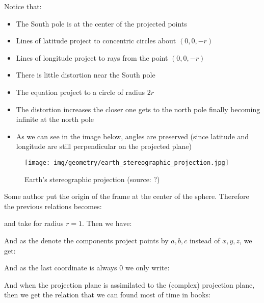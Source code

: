 	Notice that:
	\begin{itemize}
		\item The South pole is at the center of the projected points

		\item Lines of latitude project to concentric circles about $(0,0,-r)$

		\item Lines of longitude project to rays from the point $(0,0,-r)$

		\item There is little distortion near the South pole

		\item The equation project to a circle of radius $2r$

		\item The distortion increases the closer one gets to the north pole finally becoming infinite at the north pole
		
		\item As we can see in the image below, angles are preserved (since latitude and longitude are still perpendicular on the projected plane)
	\end{itemize}
	\begin{figure}[H]
		\centering
		\texttt{[image: img/geometry/earth\_stereographic\_projection.jpg]}
		\caption[Earth's stereographic projection]{Earth's stereographic projection (source: ?)}
	\end{figure}
	Some author put the origin of the frame at the center of the sphere. Therefore the previous relations becomes:
	
	and take for radius $r=1$. Then we have:
	
	And as the denote the components project points by $a,b,c$ instead of $x,y,z$, we get:
	
	And as the last coordinate is always $0$ we only write:
	
	And when the projection plane is assimilated to the (complex) projection plane, then we get the relation that we can found most of time in books:
	
